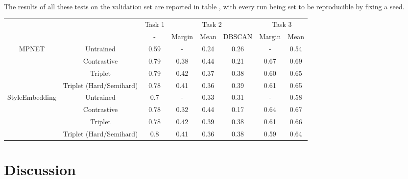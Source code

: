 \documentclass[11pt]{article}
\begin{document}
The results of all these tests on the validation set are reported in table , with every run being set to be reproducible by fixing a seed.
\begin{table*}
\setlength{\tabcolsep}{0.7em} %
\def\arraystretch{1.25}%
 \begin{tabular}{c c|c|c|c|c|c|c|}
            \cline{3-8}
             &  & Task 1 &  \multicolumn{3}{|c|}{Task 2} &  \multicolumn{2}{|c|}{Task 3}\\
            \cline{3-8}
             &  & - & Margin & Mean & DBSCAN & Margin & Mean\\
             \hline
           \multirow{4}{*}{MPNET} & Untrained & 0.59 & - & 0.24 & 0.26 & - & 0.54\\
            & Contrastive & 0.79 & 0.38 & 0.44 & 0.21 & 0.67 & 0.69 \\
             & Triplet & 0.79 & 0.42 & 0.37 & 0.38 & 0.60 & 0.65 \\
             & Triplet (Hard/Semihard) & 0.78 & 0.41 & 0.36 & 0.39 & 0.61 & 0.65\\
             \hline
            \multirow{4}{*}{StyleEmbedding} & Untrained & 0.7 & - & 0.33 & 0.31 & - & 0.58\\
            & Contrastive & 0.78 & 0.32 & 0.44 & 0.17 & 0.64 & 0.67 \\
             & Triplet & 0.78 & 0.42 & 0.39 & 0.38 & 0.61 & 0.66 \\
             & Triplet (Hard/Semihard) & 0.8 & 0.41 & 0.36 & 0.38 & 0.59 & 0.64\\
             \hline
        \end{tabular}
\end{table*}
\section{Discussion}
\label{sec:discussion}

\end{document}
